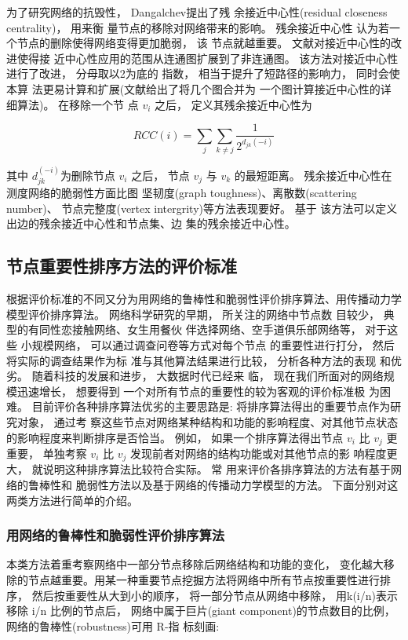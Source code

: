 				为了研究网络的抗毁性， Dangalchev\parencite{Dangalchev2006Residual}提出了残 余接近中心性(residual closeness centrality)， 用来衡 量节点的移除对网络带来的影响。 残余接近中心性 认为若一个节点的删除使得网络变得更加脆弱， 该 节点就越重要。 文献\parencite{Dangalchev2006Residual}对接近中心性的改进使得接 近中心性应用的范围从连通图扩展到了非连通图。 该方法对接近中心性进行了改进， 分母取以2为底的 指数， 相当于提升了短路径的影响力， 同时会使本算 法更易计算和扩展(文献\parencite{Dangalchev2006Residual}给出了将几个图合并为 一个图计算接近中心性的详细算法)。 在移除一个节 点 $v_i$ 之后， 定义其残余接近中心性为

				$$RCC(i)=\sum\limits_j {\sum\limits_{k\ne j} {\frac{1}{2^{d_{jk}(-i)}}}} $$

				其中 $d_{jk}^{(-i)}$为删除节点 $v_i$ 之后， 节点 $v_j$ 与 $v_k$ 的最短距离。 残余接近中心性在测度网络的脆弱性方面比图 坚韧度(graph toughness)、离散数(scattering number)、 节点完整度(vertex intergrity)等方法表现要好。 基于 该方法可以定义出边的残余接近中心性和节点集、边 集的残余接近中心性。

	\subsection{节点重要性排序方法的评价标准}
	根据评价标准的不同又分为用网络的鲁棒性和脆弱性评价排序算法、用传播动力学模型评价排序算法。
			网络科学研究的早期， 所关注的网络中节点数 目较少， 典型的有同性恋接触网络\parencite{Ide2015Risk,lpx2004wl}、女生用餐伙 伴选择网络\parencite{Moreno1961The}、空手道俱乐部网络\parencite{Stephenson1989Rethinking}等， 对于这些 小规模网络， 可以通过调查问卷等方式对每个节点 的重要性进行打分， 然后将实际的调查结果作为标 准与其他算法结果进行比较， 分析各种方法的表现 和优劣。 随着科技的发展和进步， 大数据时代已经来 临， 现在我们所面对的网络规模迅速增长， 想要得到 一个对所有节点的重要性的较为客观的评价标准极 为困难。 目前评价各种排序算法优劣的主要思路是: 将排序算法得出的重要节点作为研究对象， 通过考 察这些节点对网络某种结构和功能的影响程度、对其他节点状态的影响程度来判断排序是否恰当。 例如， 如果一个排序算法得出节点 $v_i$ 比 $v_j$ 更重要， 单独考察 $v_i$ 比 $v_j$ 发现前者对网络的结构功能或对其他节点的影 响程度更大， 就说明这种排序算法比较符合实际。 常 用来评价各排序算法的方法有基于网络的鲁棒性和 脆弱性方法以及基于网络的传播动力学模型的方法。 下面分别对这两类方法进行简单的介绍。
	\subsubsection{用网络的鲁棒性和脆弱性评价排序算法}
	本类方法着重考察网络中一部分节点移除后网络结构和功能的变化， 变化越大移除的节点越重要。用某一种重要节点挖掘方法将网络中所有节点按重要性进行排序， 然后按重要性从大到小的顺序， 将一部分节点从网络中移除， 用k(i/n)表示移除 i/n 比例的节点后， 网络中属于巨片(giant component)\parencite{Dereich2013Random}的节点数目的比例， 网络的鲁棒性(robustness)可用 R-指 标刻画\parencite{Schneider2011Mitigation}:

